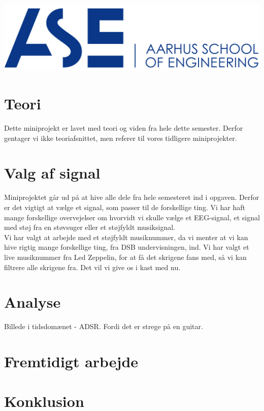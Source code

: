 \documentclass[12pt, letterpaper]{article}
\begin{document}
\begin{titlepage}

\includegraphics[scale=0.5]{billeder/au}\\ %
 

\vfill %


\end{titlepage}

\tableofcontents
\newpage

\newpage


\section{Teori}
Dette miniprojekt er lavet med teori og viden fra hele dette semester. Derfor gentager vi ikke teoriafsnittet, men referer til vores tidligere miniprojekter.

\section{Valg af signal}
Miniprojektet går ud på at hive alle dele fra hele semesteret ind i opgaven. Derfor er det vigtigt at vælge et signal, som passer til de forskellige ting. Vi har haft mange forskellige overvejelser om hvorvidt vi skulle vælge et EEG-signal, et signal med støj fra en støvsuger eller et støjfyldt musiksignal. \\
Vi har valgt at arbejde med et støjfyldt musiknummer, da vi menter at vi kan hive rigtig mange forskellige ting, fra DSB undervisningen, ind. 
Vi har valgt et live musiknummer fra Led Zeppelin, for at få det skrigene fans med, så vi kan filtrere alle skrigene fra. Det vil vi give os i kast med nu. 

\section{Analyse}

Billede i tidsdomænet - ADSR. Fordi det er strege på en guitar. 


\section{Fremtidigt arbejde}

\section{Konklusion}
\end{document}
